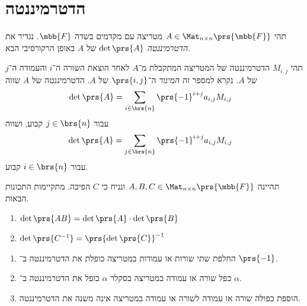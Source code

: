 \documentclass[a4paper,10pt,twoside,openany]{book}
\begin{document}
\section{הדטרמיננטה}

\begin{definition}[דטרמיננטה]
תהי
$A \in \Mat_{n \times n}\prs{\mbb{F}}$
מטריצה עם מקדמים בשדה
$\mbb{F}$.
נגדיר את
\emph{הדטרמיננטה}
$\det\prs{A}$
של
$A$
באופן הרקורסיבי הבא.

תהי
$M_{i,j}$
הדטרמיננטה של המטריצה המתקבלת מ־$A$ לאחר הוצאת השורה ה־$i$ והעמודה ה־$j$ של $A$.
נקרא למספר זה
\emph{המינור}
ה־$\prs{i,j}$ של
$A$.
הדטרמיננטה של
$A$
שווה
\begin{align*}
\det\prs{A} &= \sum_{i \in \brs{n}} \prs{-1}^{i+j} a_{i,j} M_{i,j}
\end{align*}
עבור
$j \in \brs{n}$
קבוע, ושווה
\begin{align*}
\det\prs{A} &= \sum_{j \in \brs{n}} \prs{-1}^{i+j} a_{i,j} M_{i,j}
\end{align*}
עבור
$i \in \brs{n}$
קבוע.
\end{definition}

\begin{theorem}
תהיינה
$A, B, C \in \Mat_{n \times n}\prs{\mbb{F}}$
ונניח כי
$C$
הפיכה.
מתקיימות התכונות הבאות.
\begin{enumerate}
\item $\det\prs{AB} = \det\prs{A} \cdot \det\prs{B}$
\item $\det\prs{C^{-1}} = \prs{\det\prs{C}}^{-1}$
\end{enumerate}
\end{theorem}

\begin{theorem}
\begin{enumerate}
\item החלפת שתי שורות או עמודות במטריצה כופלת את הדטרמיננטה ב־%
$\prs{-1}$.
\item כפל שורה או עמודה במטריצה בסקלר
$\alpha$
כופל את הדטרמיננטה ב־%
$\alpha$.
\item הוספת כפולה שורה או עמודה לשורה או עמודה במטריצה אינה משנה את הדטרמיננטה.
\end{enumerate}
\end{theorem}
\end{document}
